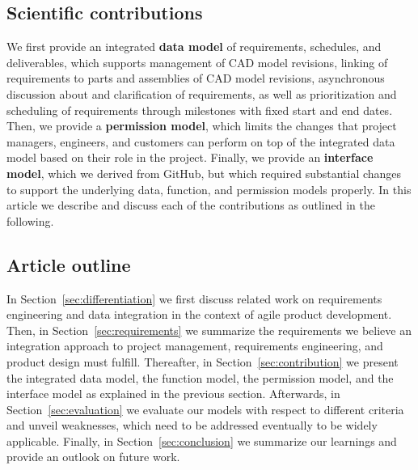     \subsection*{Scientific contributions}
    We first provide an integrated \textbf{data model} of requirements, schedules, and deliverables, which supports management of CAD model revisions, linking of requirements to parts and assemblies of CAD model revisions, asynchronous discussion about and clarification of requirements, as well as prioritization and scheduling of requirements through milestones with fixed start and end dates.
    Then, we provide a \textbf{permission model}, which limits the changes that project managers, engineers, and customers can perform on top of the integrated data model based on their role in the project.
    Finally, we provide an \textbf{interface model}, which we derived from GitHub, but which required substantial changes to support the underlying data, function, and permission models properly.
    In this article we describe and discuss each of the contributions as outlined in the following.

    \subsection*{Article outline}
    In Section~\ref{sec:differentiation} we first discuss related work on requirements engineering and data integration in the context of agile product development.
    Then, in Section~\ref{sec:requirements} we summarize the requirements we believe an integration approach to project management, requirements engineering, and product design must fulfill.
    Thereafter, in Section~\ref{sec:contribution} we present the integrated data model, the function model, the permission model, and the interface model as explained in the previous section.
    Afterwards, in Section~\ref{sec:evaluation} we evaluate our models with respect to different criteria and unveil weaknesses, which need to be addressed eventually to be widely applicable.
    Finally, in Section~\ref{sec:conclusion} we summarize our learnings and provide an outlook on future work.
    
